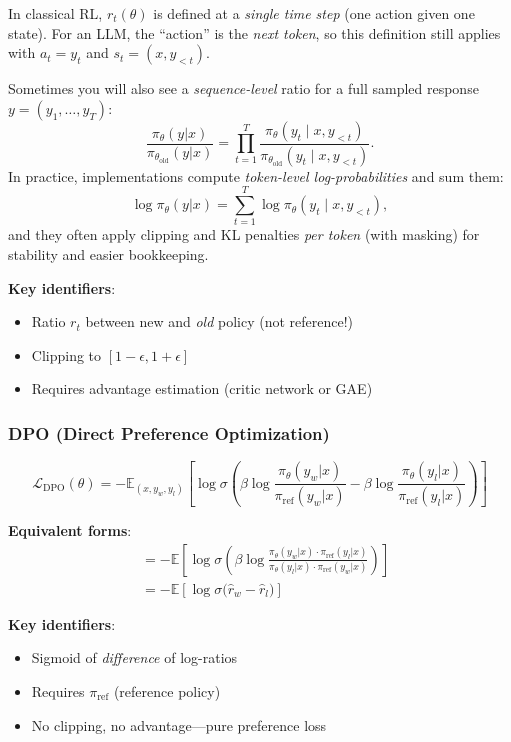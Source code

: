 \begin{remark}
    In classical RL, $r_t(\theta)$ is defined at a \emph{single time step} (one action given one state).
    For an LLM, the ``action'' is the \emph{next token}, so this definition still applies with $a_t = y_t$ and $s_t = (x, y_{<t})$.

    Sometimes you will also see a \emph{sequence-level} ratio for a full sampled response $y = (y_1,\ldots,y_T)$:
    \[
        \frac{\pi_\theta(y|x)}{\pi_{\theta_{\text{old}}}(y|x)}
        = \prod_{t=1}^{T} \frac{\pi_\theta(y_t \mid x, y_{<t})}{\pi_{\theta_{\text{old}}}(y_t \mid x, y_{<t})}.
    \]
    In practice, implementations compute \emph{token-level log-probabilities} and sum them:
    \[
        \log \pi_\theta(y|x) = \sum_{t=1}^{T} \log \pi_\theta(y_t \mid x, y_{<t}),
    \]
    and they often apply clipping and KL penalties \emph{per token} (with masking) for stability and easier bookkeeping.
\end{remark}

\textbf{Key identifiers}:
\begin{itemize}
    \item Ratio $r_t$ between new and \emph{old} policy (not reference!)
    \item Clipping to $[1-\epsilon, 1+\epsilon]$
    \item Requires advantage estimation (critic network or GAE)
\end{itemize}

\subsubsection{DPO (Direct Preference Optimization)}
\[
    \mathcal{L}_{\text{DPO}}(\theta) = -\mathbb{E}_{(x, y_w, y_l)} \left[ \log \sigma\left( \beta \log \frac{\pi_\theta(y_w|x)}{\pi_{\text{ref}}(y_w|x)} - \beta \log \frac{\pi_\theta(y_l|x)}{\pi_{\text{ref}}(y_l|x)} \right) \right]
\]

\textbf{Equivalent forms}:
\begin{align*}
     & = -\mathbb{E} \left[ \log \sigma\left( \beta \log \frac{\pi_\theta(y_w|x) \cdot \pi_{\text{ref}}(y_l|x)}{\pi_\theta(y_l|x) \cdot \pi_{\text{ref}}(y_w|x)} \right) \right] \\
     & = -\mathbb{E} \left[ \log \sigma\bigl( \hat{r}_w - \hat{r}_l \bigr) \right]
\end{align*}

\textbf{Key identifiers}:
\begin{itemize}
    \item Sigmoid of \emph{difference} of log-ratios
    \item Requires $\pi_{\text{ref}}$ (reference policy)
    \item No clipping, no advantage---pure preference loss
\end{itemize}

